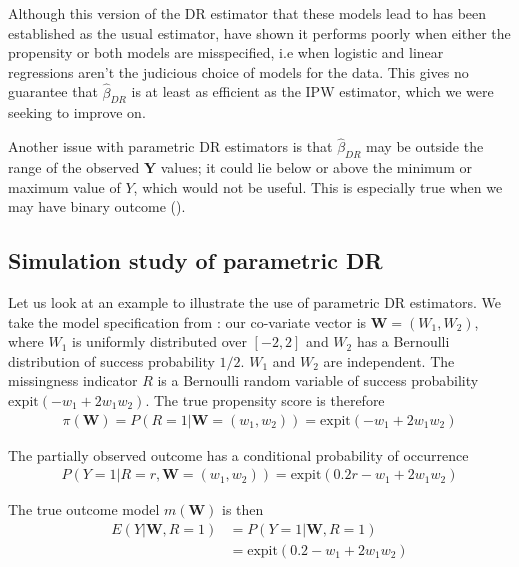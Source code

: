 \documentclass[12pt,twoside]{article}
\newcommand{\expit}{\text{expit}}
\begin{document}
Although this version of the DR estimator that these models lead to has been established as the usual estimator, \citeauthor{kang} have shown it performs poorly when either the propensity or both models are misspecified, i.e when logistic and linear regressions aren't the judicious choice of models for the data. This gives no guarantee that $\hat\beta_{DR}$ is at least as efficient as the IPW estimator, which we were seeking to improve on.

Another issue with parametric DR estimators is that $\hat\beta_{DR}$ may be outside the range of the observed $\mathbf{Y}$ values; it could lie below or above the minimum or maximum value of $Y$, which would not be useful. This is especially true when we may have binary outcome (\citeauthor{vansteelandt}).

\subsection{Simulation study of parametric DR}
\label{para_model}

Let us look at an example to illustrate the use of parametric DR estimators. We take the model specification from \citet{benkeser2017}: our co-variate vector is $\mathbf{W} = (W_1, W_2)$, where $W_1$ is uniformly distributed over $[-2,2]$ and $W_2$ has a Bernoulli distribution of success probability $1/2$. $W_1$ and $W_2$ are independent. The missingness indicator $R$ is a Bernoulli random variable of success probability $\expit(-w_1 + 2w_1w_2)$. The true propensity score is therefore
\begin{align*}
    \pi(\mathbf{W}) = P(R = 1 |\mathbf{W} = (w_1,w_2)) = \expit(-w_1 + 2w_1w_2)
\end{align*}

The partially observed outcome has a conditional probability of occurrence 
\begin{align*}
    P(Y = 1|R = r,\mathbf{W} = (w_1, w_2)) = \expit(0.2r - w_1 + 2w_1w_2)
\end{align*}

The true outcome model $m(\mathbf{W})$ is then 
\begin{align*}
    E(Y|\mathbf{W}, R=1) &= P(Y = 1|\mathbf{W}, R= 1) \\
    & = \expit(0.2 - w_1 + 2w_1w_2)
\end{align*}
\end{document}
